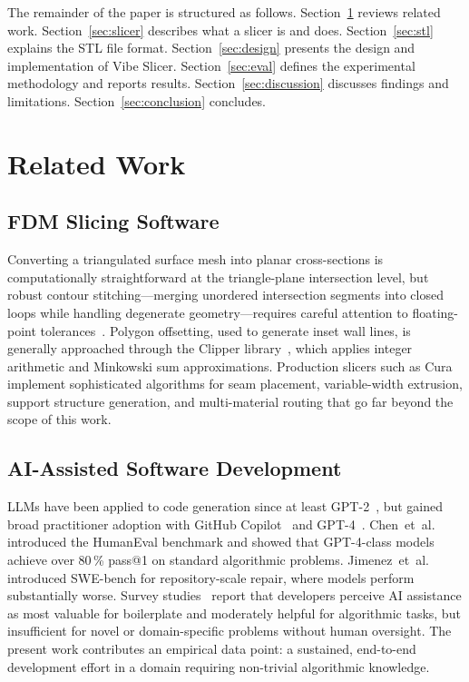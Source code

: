 \documentclass[10pt,twocolumn,a4paper]{article}
\begin{document}
The remainder of the paper is structured as follows.
Section~\ref{sec:related} reviews related work.
Section~\ref{sec:slicer} describes what a slicer is and does.
Section~\ref{sec:stl} explains the STL file format.
Section~\ref{sec:design} presents the design and implementation of Vibe Slicer.
Section~\ref{sec:eval} defines the experimental methodology and reports results.
Section~\ref{sec:discussion} discusses findings and limitations.
Section~\ref{sec:conclusion} concludes.

\section{Related Work}
\label{sec:related}

\subsection{FDM Slicing Software}

Converting a triangulated surface mesh into planar cross-sections
is computationally straightforward at the triangle-plane intersection
level, but robust contour stitching—merging unordered intersection
segments into closed loops while handling degenerate geometry—requires
careful attention to floating-point tolerances~\cite{gibson2021additive}.
Polygon offsetting, used to generate inset wall lines, is generally
approached through the Clipper library~\cite{clipper2}, which applies
integer arithmetic and Minkowski sum approximations.
Production slicers such as Cura implement sophisticated algorithms
for seam placement, variable-width extrusion, support structure
generation, and multi-material routing that go far beyond the scope
of this work.

\subsection{AI-Assisted Software Development}

LLMs have been applied to code generation since at least GPT-2~\cite{radford2019gpt2},
but gained broad practitioner adoption with GitHub Copilot~\cite{copilot}
and GPT-4~\cite{openai2023gpt4}.
Chen~et~al.~\cite{chen2021codex} introduced the HumanEval benchmark
and showed that GPT-4-class models achieve over 80\,\% pass@1
on standard algorithmic problems.
Jimenez~et~al.~\cite{jimenez2023swebench} introduced SWE-bench
for repository-scale repair, where models perform substantially worse.
Survey studies~\cite{ziegler2022productivity} report that developers
perceive AI assistance as most valuable for boilerplate and
moderately helpful for algorithmic tasks, but insufficient for
novel or domain-specific problems without human oversight.
The present work contributes an empirical data point: a sustained,
end-to-end development effort in a domain requiring non-trivial
algorithmic knowledge.
\end{document}
